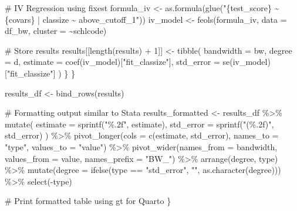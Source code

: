 \documentclass[
  letterpaper,
  DIV=11,
  numbers=noendperiod]{scrartcl}
\newenvironment{Shaded}{\begin{snugshade}}{\end{snugshade}}
\newcommand{\AttributeTok}[1]{\textcolor[rgb]{0.40,0.45,0.13}{#1}}
\newcommand{\CommentTok}[1]{\textcolor[rgb]{0.37,0.37,0.37}{#1}}
\newcommand{\DecValTok}[1]{\textcolor[rgb]{0.68,0.00,0.00}{#1}}
\newcommand{\FunctionTok}[1]{\textcolor[rgb]{0.28,0.35,0.67}{#1}}
\newcommand{\NormalTok}[1]{\textcolor[rgb]{0.00,0.23,0.31}{#1}}
\newcommand{\OtherTok}[1]{\textcolor[rgb]{0.00,0.23,0.31}{#1}}
\newcommand{\SpecialCharTok}[1]{\textcolor[rgb]{0.37,0.37,0.37}{#1}}
\newcommand{\StringTok}[1]{\textcolor[rgb]{0.13,0.47,0.30}{#1}}
\begin{document}
\begin{Shaded}
\begin{Highlighting}[]
      \CommentTok{\# IV Regression using fixest}
\NormalTok{      formula\_iv }\OtherTok{\textless{}{-}} \FunctionTok{as.formula}\NormalTok{(}\FunctionTok{glue}\NormalTok{(}\StringTok{"\{test\_score\} \textasciitilde{} \{covars\} | classize \textasciitilde{} above\_cutoff\_1"}\NormalTok{))}
\NormalTok{      iv\_model }\OtherTok{\textless{}{-}} \FunctionTok{feols}\NormalTok{(formula\_iv, }\AttributeTok{data =}\NormalTok{ df\_bw, }\AttributeTok{cluster =} \SpecialCharTok{\textasciitilde{}}\NormalTok{schlcode)}
      
      \CommentTok{\# Store results}
\NormalTok{      results[[}\FunctionTok{length}\NormalTok{(results) }\SpecialCharTok{+} \DecValTok{1}\NormalTok{]] }\OtherTok{\textless{}{-}} \FunctionTok{tibble}\NormalTok{(}
        \AttributeTok{bandwidth =}\NormalTok{ bw,}
        \AttributeTok{degree =}\NormalTok{ d,}
        \AttributeTok{estimate =} \FunctionTok{coef}\NormalTok{(iv\_model)[}\StringTok{"fit\_classize"}\NormalTok{],}
        \AttributeTok{std\_error =} \FunctionTok{se}\NormalTok{(iv\_model)[}\StringTok{"fit\_classize"}\NormalTok{]}
\NormalTok{      )}
\NormalTok{    \}}
\NormalTok{  \}}
  
\NormalTok{  results\_df }\OtherTok{\textless{}{-}} \FunctionTok{bind\_rows}\NormalTok{(results)}


\CommentTok{\# Formatting output similar to Stata}
\NormalTok{  results\_formatted }\OtherTok{\textless{}{-}}\NormalTok{ results\_df }\SpecialCharTok{\%\textgreater{}\%}
    \FunctionTok{mutate}\NormalTok{(}
      \AttributeTok{estimate =} \FunctionTok{sprintf}\NormalTok{(}\StringTok{"\%.2f"}\NormalTok{, estimate),}
      \AttributeTok{std\_error =} \FunctionTok{sprintf}\NormalTok{(}\StringTok{"(\%.2f)"}\NormalTok{, std\_error)}
\NormalTok{    ) }\SpecialCharTok{\%\textgreater{}\%}
    \FunctionTok{pivot\_longer}\NormalTok{(}\AttributeTok{cols =} \FunctionTok{c}\NormalTok{(estimate, std\_error), }\AttributeTok{names\_to =} \StringTok{"type"}\NormalTok{, }\AttributeTok{values\_to =} \StringTok{"value"}\NormalTok{) }\SpecialCharTok{\%\textgreater{}\%}
    \FunctionTok{pivot\_wider}\NormalTok{(}\AttributeTok{names\_from =}\NormalTok{ bandwidth, }\AttributeTok{values\_from =}\NormalTok{ value, }\AttributeTok{names\_prefix =} \StringTok{"BW\_"}\NormalTok{) }\SpecialCharTok{\%\textgreater{}\%}
    \FunctionTok{arrange}\NormalTok{(degree, type) }\SpecialCharTok{\%\textgreater{}\%}
    \FunctionTok{mutate}\NormalTok{(}\AttributeTok{degree =} \FunctionTok{ifelse}\NormalTok{(type }\SpecialCharTok{==} \StringTok{"std\_error"}\NormalTok{, }\StringTok{""}\NormalTok{, }\FunctionTok{as.character}\NormalTok{(degree))) }\SpecialCharTok{\%\textgreater{}\%}
    \FunctionTok{select}\NormalTok{(}\SpecialCharTok{{-}}\NormalTok{type)}

  \CommentTok{\# Print formatted table using gt for Quarto}
\NormalTok{\}}
\end{Highlighting}
\end{Shaded}
\end{document}
